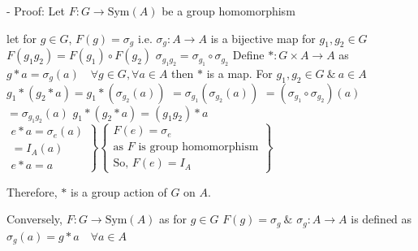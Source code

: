 - Proof: Let $F: G \to \text{Sym}(A)$ be a group homomorphism

let for $g \in G$, $F(g) = \sigma_g$
i.e. $\sigma_g : A \to A$ is a bijective map
for $g_1, g_2 \in G$
$F(g_1 g_2) = F(g_1) \circ F(g_2)$
$\sigma_{g_1 g_2} = \sigma_{g_1} \circ \sigma_{g_2}$
Define $*: G \times A \to A$ as
$g * a = \sigma_g(a) \quad \forall g \in G, \forall a \in A$
then $*$ is a map.
For $g_1, g_2 \in G \ \& \ a \in A$
$g_1 * (g_2 * a) = g_1 * (\sigma_{g_2}(a))$
$= \sigma_{g_1}(\sigma_{g_2}(a))$
$= (\sigma_{g_1} \circ \sigma_{g_2})(a)$
$= \sigma_{g_1 g_2}(a)$
$g_1 * (g_2 * a) = (g_1 g_2) * a$
$\left. \begin{matrix} e * a = \sigma_e(a) \\ = I_A(a) \\ e * a = a \end{matrix} \right\} \left\{ \begin{matrix} F(e) = \sigma_e \\ \text{as } F \text{ is group homomorphism} \\ \text{So, } F(e) = I_A \end{matrix} \right\}$

Therefore, $*$ is a group action of $G$ on $A$.

Conversely, $F: G \to \text{Sym}(A)$ as
for $g \in G$
$F(g) = \sigma_g \ \&$
$\sigma_g : A \to A$ is defined as
$\sigma_g(a) = g * a \quad \forall a \in A$
